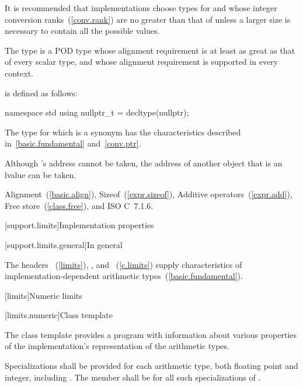\pnum
\begin{note}
It is recommended that implementations choose types for  and 
whose integer conversion ranks~(\ref{conv.rank}) are no greater than that of
 unless a larger size is necessary to contain all the possible values.
\end{note}

\pnum
The type
%
 is a POD type whose alignment requirement
is at least as great as that of every scalar type, and whose alignment
requirement is supported in every context.

\pnum
{}%
 is defined as follows:

\begin{codeblock}
namespace std {
  using nullptr_t = decltype(nullptr);
}
\end{codeblock}

The type for which  is a synonym has the characteristics
described in~\ref{basic.fundamental} and~\ref{conv.ptr}. \begin{note} Although
's address cannot be taken, the address of another
 object that is an lvalue can be taken. \end{note}

\xref Alignment~(\ref{basic.align}), Sizeof~(\ref{expr.sizeof}), Additive
operators~(\ref{expr.add}), Free store~(\ref{class.free}), and ISO C~7.1.6.

[support.limits]{Implementation properties}

[support.limits.general]{In general}

\pnum
The headers
~(\ref{limits}),
, and
~(\ref{c.limits})
supply characteristics of implementation-dependent
arithmetic types~(\ref{basic.fundamental}).

[limits]{Numeric limits}

[limits.numeric]{Class template }

\pnum
The
%
class template provides a \Cpp program with information about various properties of
the implementation's representation of the
arithmetic types.

\pnum
Specializations shall be provided for each
arithmetic type,
both floating point and integer, including
.
The member
shall be
for all such specializations of
.

